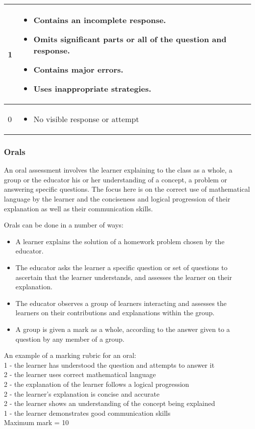 \begin{table}[H]
\begin{center}
\begin{tabular}{|p{3cm}|p{8.5cm}|}
1 &
\begin{itemize}[noitemsep]
\item Contains an incomplete response.
\item Omits significant parts or all of the question and response.
\item Contains major errors.
\item Uses inappropriate strategies.
\end{itemize} \\ \hline
0 &
\begin{itemize}[noitemsep]
\item No visible response or attempt
\end{itemize} \\ \hline
  \end{tabular}

 \end{center}

\end{table}

\subsubsection{Orals}
An oral assessment involves the learner explaining to the class as a whole, a group or the educator his or her understanding of a concept, a problem or answering specific questions. The focus here is on the correct use of mathematical language by the learner and the conciseness and logical progression of their explanation as well as their communication skills.\par

Orals can be done in a number of ways:
\begin{itemize}[noitemsep]
\item A learner explains the solution of a homework problem chosen by the educator.
\item The educator asks the learner a specific question or set of questions to ascertain that the learner understands, and assesses the learner on their explanation.
\item The educator observes a group of learners interacting and assesses the learners on their contributions and explanations within the group.
\item A group is given a mark as a whole, according to the answer given to a question by any member of a group.
\end{itemize}
An example of a marking rubric for an oral:\\
1	-	the learner has understood the question and attempts to answer it\\
2	-	the learner uses correct mathematical language\\
2	-	the explanation of the learner follows a logical progression\\
2	-	the learner’s explanation is concise and accurate\\
2	-	the learner shows an understanding of the concept being explained\\
1	-	the learner demonstrates good communication skills\\
Maximum mark = 10 \par

